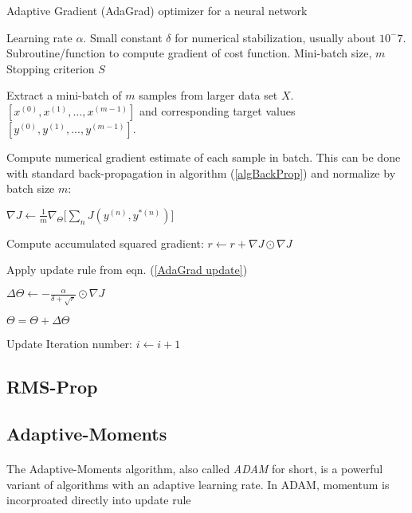 \documentclass[12pt,letterpaper]{article}
\begin{document}
\begin{algorithm}[H]
\caption{Adaptive Gradient (AdaGrad) optimizer for a neural network}
\label{algAdaGrad}

\begin{algorithmic}

\REQUIRE Learning rate $\alpha$.
\REQUIRE Small constant $\delta$ for numerical stabilization, usually about $10^-7$.
\REQUIRE Subroutine/function to compute gradient of cost function.
\REQUIRE Mini-batch size, $m$
\REQUIRE Stopping criterion $S$

	\item Extract a mini-batch of $m$ samples from larger data set $X$. $[x^{(0)},x^{(1)},...,x^{(m-1)}]$ and corresponding target values 
	$[y^{(0)},y^{(1)},...,y^{(m-1)}]$.
	\item Compute numerical gradient estimate of each sample in batch. This can be done with standard back-propagation in algorithm (\ref{algBackProp}) and 			 	normalize by batch size $m$:
	\item $\nabla J \leftarrow \frac{1}{m}\nabla_{\Theta} \Big[ \sum_n J(y^{(n)},y^{*(n)}) \Big] $
	\item Compute accumulated squared gradient: $r \leftarrow r  + \nabla J \odot \nabla J$
	\item Apply update rule from eqn. (\ref{AdaGrad update})
	\item $\Delta \Theta \leftarrow -\frac{\alpha}{\delta+\sqrt{r}} \odot \nabla J$
	\item $\Theta = \Theta + \Delta \Theta$	
	\item Update Iteration number: $i \leftarrow i + 1$
\ENDWHILE

\end{algorithmic}
\end{algorithm}

\subsection{RMS-Prop}


\subsection{Adaptive-Moments}

\paragraph*{}The Adaptive-Moments algorithm, also called \textit{ADAM} for short, is a powerful variant of algorithms with an adaptive learning rate. In ADAM, momentum is incorproated directly into update rule
\end{document}
